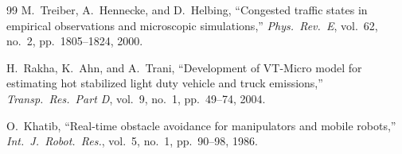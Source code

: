 \documentclass[conference]{IEEEtran}
\begin{document}
\begin{thebibliography}{99}
M.~Treiber, A.~Hennecke, and D.~Helbing,
``Congested traffic states in empirical observations and microscopic
simulations,''
\textit{Phys.\ Rev.\ E}, vol.~62, no.~2, pp.~1805--1824, 2000.

H.~Rakha, K.~Ahn, and A.~Trani,
``Development of VT-Micro model for estimating hot stabilized light duty
vehicle and truck emissions,''
\textit{Transp.\ Res.\ Part D}, vol.~9, no.~1, pp.~49--74, 2004.

O.~Khatib,
``Real-time obstacle avoidance for manipulators and mobile robots,''
\textit{Int.\ J.\ Robot.\ Res.}, vol.~5, no.~1, pp.~90--98, 1986.

\end{thebibliography}
\end{document}
